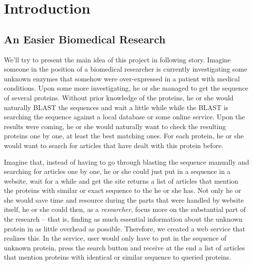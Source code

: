 
\chapter{Introduction} %

\label{Chapter1} %



\section{An Easier Biomedical Research}

We'll try to present the main idea of this project in following story. Imagine someone in the position of a biomedical researcher is currently investigating some unknown enzymes that somehow were over-expressed in a patient with medical conditions. Upon some more investigating, he or she managed to get the sequence of several proteins. Without prior knowledge of the proteins, he or she would naturally BLAST the sequences and wait a little while while the BLAST is searching the sequence against a local database or some online service. Upon the results were coming, he or she would naturally want to check the resulting proteins one by one, at least the best matching ones. For each protein, he or she would want to search for articles that have dealt with this protein before.

Imagine that, instead of having to go through blasting the sequence manually and searching for articles one by one, he or she could just put in a sequence in a website, wait for a while and get the site returns a list of articles that mention the proteins with similar or exact sequence to the he or she has. Not only he or she would save time and resource during the parts that were handled by website itself, he or she could then, as a \textit{researcher}, focus more on the substantial part of the research -- that is, finding as much essential information about the unknown protein in as little overhead as possible. Therefore, we created a web service that realizes this. In the service, user would only have to put in the sequence of unknown protein, press the search button and receive at the end a list of articles that mention proteins with identical or similar sequence to queried proteins.

